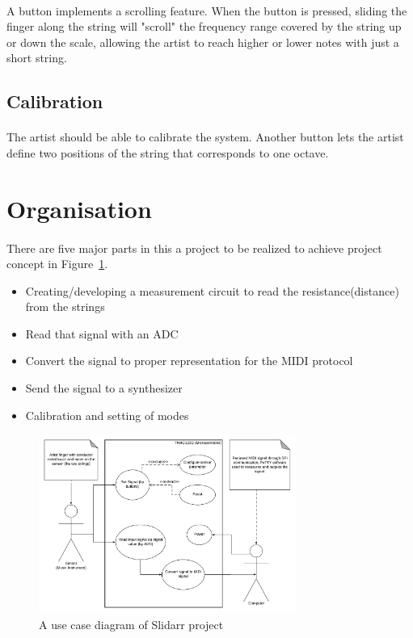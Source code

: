 \documentclass{article}
\begin{document}
\paragraph{}A button implements a scrolling feature. When the button is pressed, sliding the finger along the string will "scroll" the frequency range covered by the string up or down the scale, allowing the artist to reach higher or lower notes with just a short string.

\subsection{Calibration}
\paragraph{}The artist should be able to calibrate the system. Another button lets the artist define two positions of the string that corresponds to one octave.

\section{Organisation}
\paragraph{}There are five major parts in this a project to be realized to achieve project concept in Figure~\ref{myfigure}.
\begin{itemize}
    \item Creating/developing a measurement circuit to read the resistance(distance) from the strings
    \item Read that signal with an ADC
    \item Convert the signal to proper representation for the MIDI protocol
    \item Send the signal to a synthesizer
    \item Calibration and setting of modes
\end{itemize}
\begin{figure}[h]
\centering
\includegraphics[width=0.75\textwidth]{PESUML.PNG}
\caption{A use case diagram of Slidarr project}
\label{myfigure}
\end{figure}
\end{document}
